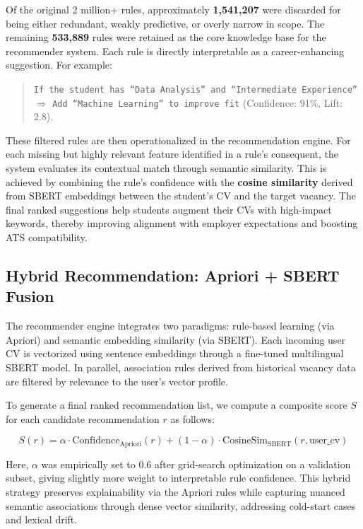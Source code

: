 \documentclass{svproc} %
\begin{document}
	Of the original 2 million+ rules, approximately \textbf{1,541,207} were discarded for being either redundant, weakly predictive, or overly narrow in scope. The remaining \textbf{533,889} rules were retained as the core knowledge base for the recommender system. Each rule is directly interpretable as a career-enhancing suggestion. For example:
	
	\begin{quote}
		\small
		\texttt{If the student has “Data Analysis” and “Intermediate Experience”} $\Rightarrow$ \texttt{Add “Machine Learning” to improve fit} (Confidence: 91\%, Lift: 2.8).
	\end{quote}
	
	These filtered rules are then operationalized in the recommendation engine. For each missing but highly relevant feature identified in a rule’s consequent, the system evaluates its contextual match through semantic similarity. This is achieved by combining the rule’s confidence with the \textbf{cosine similarity} derived from SBERT embeddings between the student’s CV and the target vacancy. The final ranked suggestions help students augment their CVs with high-impact keywords, thereby improving alignment with employer expectations and boosting ATS compatibility.
	
	
	\subsection{Hybrid Recommendation: Apriori + SBERT Fusion}
	
	The recommender engine integrates two paradigms: rule-based learning (via Apriori) and semantic embedding similarity (via SBERT). Each incoming user CV is vectorized using sentence embeddings through a fine-tuned multilingual SBERT model. In parallel, association rules derived from historical vacancy data are filtered by relevance to the user’s vector profile.
	
	To generate a final ranked recommendation list, we compute a composite score $S$ for each candidate recommendation $r$ as follows:
	
	\[
	S(r) = \alpha \cdot \text{Confidence}_{\text{Apriori}}(r) + (1 - \alpha) \cdot \text{CosineSim}_{\text{SBERT}}(r, \text{user\_cv})
	\]
	
	Here, $\alpha$ was empirically set to 0.6 after grid-search optimization on a validation subset, giving slightly more weight to interpretable rule confidence. This hybrid strategy preserves explainability via the Apriori rules while capturing nuanced semantic associations through dense vector similarity, addressing cold-start cases and lexical drift.
	
\end{document}
